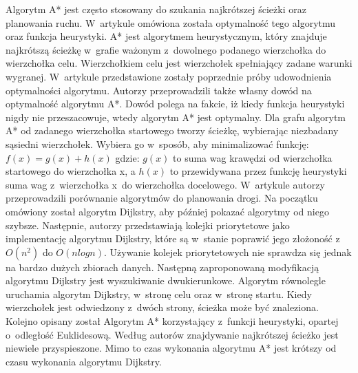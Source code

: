 \indent
Algorytm A* jest często stosowany do szukania najkrótszej ścieżki oraz planowania ruchu. W~artykule \cite{dechter1985generalized} omówiona została optymalność tego algorytmu oraz funkcja heurystyki. A* jest algorytmem heurystycznym, który znajduje najkrótszą ścieżkę w~grafie ważonym z~dowolnego podanego wierzchołka do wierzchołka celu. Wierzchołkiem celu jest wierzchołek spełniający zadane warunki wygranej. W~artykule przedstawione zostały poprzednie próby udowodnienia optymalności algorytmu. Autorzy przeprowadzili także własny dowód na optymalność algorytmu A*. Dowód polega na fakcie, iż kiedy funkcja heurystyki nigdy nie przeszacowuje, wtedy algorytm A* jest optymalny. Dla grafu algorytm A* od zadanego wierzchołka startowego tworzy ścieżkę, wybierając niezbadany sąsiedni wierzchołek. Wybiera go w~sposób, aby minimalizować funkcję:
\newline
\newline
\begin{math} f(x) = g(x) + h(x)\end{math}
\newline
\newline
gdzie:
\newline
\newline
\begin{math} g(x) \end{math} to suma wag krawędzi od wierzchołka startowego do wierzchołka x, a
\begin{math} h(x) \end{math} to przewidywana przez funkcję heurystyki suma wag z~wierzchołka x~do wierzchołka docelowego.
\newline
\indent
W~artykule \cite{delling2009engineering} autorzy przeprowadzili porównanie algorytmów do planowania drogi. Na początku omówiony został algorytm Dijkstry, aby później pokazać algorytmy od niego szybsze. Następnie, autorzy przedstawiają kolejki priorytetowe jako implementację algorytmu Dijkstry, które są w~stanie poprawić jego złożoność z~\begin{math} O(n^2) \end{math} do \begin{math} O(nlogn) \end{math}. Używanie kolejek priorytetowych nie sprawdza się jednak na bardzo dużych zbiorach danych. Następną zaproponowaną modyfikacją algorytmu Dijkstry jest wyszukiwanie dwukierunkowe. Algorytm równolegle uruchamia algorytm Dijkstry, w~stronę celu oraz w~stronę startu. Kiedy wierzchołek jest odwiedzony z~dwóch strony, ścieżka może być znaleziona. Kolejno opisany został Algorytm A* korzystający z~funkcji heurystyki, opartej o~odległość Euklidesową. Według autorów znajdywanie najkrótszej ścieżko jest niewiele przyspieszone. Mimo to czas wykonania algorytmu A* jest krótszy od czasu wykonania algorytmu Dijkstry.
